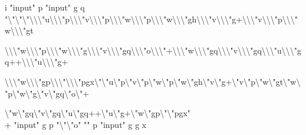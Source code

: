 \begin{smurf}
\footnotesize
i "input" p
"input" g q
"\textbackslash{}"\textbackslash{}"\textbackslash{}"\textbackslash{}\textbackslash{}\textbackslash{}"u\textbackslash{}\textbackslash{}\textbackslash{}"p\textbackslash{}\textbackslash{}\textbackslash{}"v\textbackslash{}\textbackslash{}\textbackslash{}"p\textbackslash{}\textbackslash{}\textbackslash{}"w\textbackslash{}\textbackslash{}\textbackslash{}"p\textbackslash{}\textbackslash{}\textbackslash{}"w\textbackslash{}\textbackslash{}\textbackslash{}"gh\textbackslash{}\textbackslash{}\textbackslash{}"v\textbackslash{}\textbackslash{}\textbackslash{}"g+\textbackslash{}\textbackslash{}\textbackslash{}"v\textbackslash{}\textbackslash{}\textbackslash{}"p\textbackslash{}\textbackslash{}\textbackslash{}"w\textbackslash{}\textbackslash{}\textbackslash{}"gt 

\textbackslash{}\textbackslash{}\textbackslash{}"w\textbackslash{}\textbackslash{}\textbackslash{}"p\textbackslash{}\textbackslash{}\textbackslash{}"w\textbackslash{}\textbackslash{}\textbackslash{}"g\textbackslash{}\textbackslash{}\textbackslash{}"v\textbackslash{}\textbackslash{}\textbackslash{}"gq\textbackslash{}\textbackslash{}\textbackslash{}"o\textbackslash{}\textbackslash{}\textbackslash{}"+\textbackslash{}\textbackslash{}\textbackslash{}"w\textbackslash{}\textbackslash{}\textbackslash{}"gq\textbackslash{}\textbackslash{}\textbackslash{}"v\textbackslash{}\textbackslash{}\textbackslash{}"gq\textbackslash{}\textbackslash{}\textbackslash{}"u\textbackslash{}\textbackslash{}\textbackslash{}"gq++\textbackslash{}\textbackslash{}\textbackslash{}"u\textbackslash{}\textbackslash{}\textbackslash{}"g+

\textbackslash{}\textbackslash{}\textbackslash{}"w\textbackslash{}\textbackslash{}\textbackslash{}"gp\textbackslash{}\textbackslash{}\textbackslash{}"\textbackslash{}\textbackslash{}\textbackslash{}"pgx\textbackslash{}"\textbackslash{}"u\textbackslash{}"p\textbackslash{}"v\textbackslash{}"p\textbackslash{}"w\textbackslash{}"p\textbackslash{}"w\textbackslash{}"gh\textbackslash{}"v\textbackslash{}"g+\textbackslash{}"v\textbackslash{}"p\textbackslash{}"w\textbackslash{}"gt\textbackslash{}"w\textbackslash{}"p\textbackslash{}"w\textbackslash{}"g\textbackslash{}"v\textbackslash{}"gq\textbackslash{}"o\textbackslash{}"+

\textbackslash{}"w\textbackslash{}"gq\textbackslash{}"v\textbackslash{}"gq\textbackslash{}"u\textbackslash{}"gq++\textbackslash{}"u\textbackslash{}"g+\textbackslash{}"w\textbackslash{}"gp\textbackslash{}"\textbackslash{}"pgx"
\\
+
"input" g p
"\textbackslash{}"\textbackslash{}"o" "" p
"input" g g x
\end{smurf}

